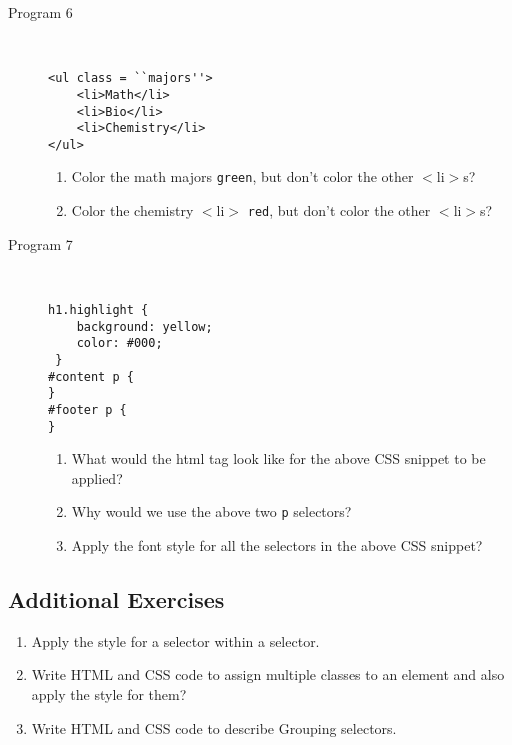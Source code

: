 \documentclass[11pt,a4paper]{article}
\def\AnswerBox{\fbox{\begin{minipage}{4in}\hfill\vspace{0.5in}\end{minipage}}}
\begin{document}
\begin{description}
\item [Program 6]\
\begin{lstlisting}
<ul class = ``majors''>
    <li>Math</li>
    <li>Bio</li>
    <li>Chemistry</li>
</ul>
\end{lstlisting}
\AnswerBox
\begin{enumerate}[label=\bfseries Q\arabic*:]\itemsep10pt
\item Color the math majors \texttt{green}, but don't color the other $<$li$>$s?
\item Color the chemistry $<$li$>$ \texttt{red}, but don't color the other $<$li$>$s?
\end{enumerate}

\item [Program 7]\
\begin{lstlisting}
h1.highlight {
    background: yellow;
    color: #000;
 }
#content p {
}
#footer p {
}
\end{lstlisting}
\AnswerBox
\begin{enumerate}[label=\bfseries Q\arabic*:]\itemsep10pt
\item What would the html tag look like for the above CSS snippet to be applied?
\item Why would we use the above two \texttt{p} selectors?
\item Apply the font style for all the selectors in the above CSS snippet?
\end{enumerate}

\end{description}
\subsection*{Additional Exercises}
\begin{enumerate}
\item Apply the style for a selector within a selector.
\item Write HTML and CSS code to assign multiple classes to an element and also apply the style for them?
\item Write HTML and CSS code to describe Grouping selectors.
\end{enumerate}
\end{document}
